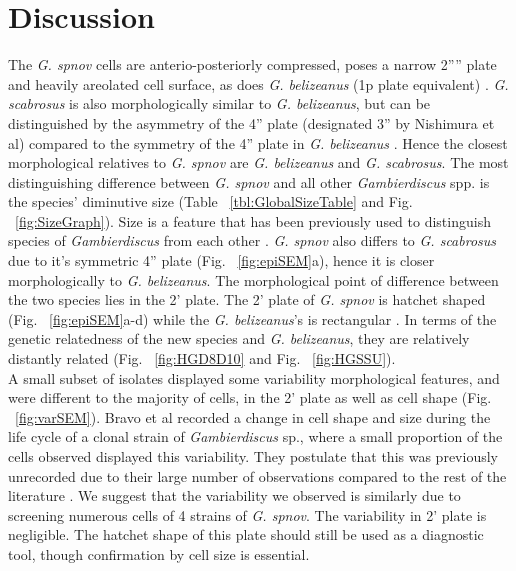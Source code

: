 \documentclass[12pt]{article}
\begin{document}
\newpage
\section{Discussion}
The \emph{G. spnov} cells are anterio-posteriorly compressed, poses a narrow 2'''' plate and heavily areolated cell surface, as does \emph{G. belizeanus} (1p plate equivalent)                                                                                                                                                                                           \citep{litaker2009taxonomy}. \emph{G. scabrosus} is also morphologically similar to \emph{G. belizeanus}, but can be distinguished by the asymmetry of the 4'' plate (designated 3'' by Nishimura et al) compared to the symmetry of the 4'' plate in \emph{G. belizeanus} \citep{nishimura2014morphology}. Hence the closest morphological relatives to \emph{G. spnov} are \emph{G. belizeanus} and \emph{G. scabrosus}. The most distinguishing difference between \emph{G. spnov} and all other \emph{Gambierdiscus} spp. is the species' diminutive size (Table ~\ref{tbl:GlobalSizeTable} and Fig. ~\ref{fig:SizeGraph}). Size is a feature that has been previously used to distinguish species of \emph{Gambierdiscus} from each other \citep{litaker2009taxonomy}. 
\emph{G. spnov} also differs to \emph{G. scabrosus} due to it's symmetric 4'' plate (Fig. ~\ref{fig:epiSEM}a), hence it is closer morphologically to \emph{G. belizeanus}. The morphological point of difference between the two species lies in the 2' plate. The 2' plate of \emph{G. spnov} is hatchet shaped (Fig. ~\ref{fig:epiSEM}a-d) while the \emph{G. belizeanus}'s is rectangular \citep{faust1995observation}. In terms of the genetic relatedness of the new species and \textit{G. belizeanus}, they are relatively distantly related (Fig. ~\ref{fig:HGD8D10} and Fig. ~\ref{fig:HGSSU}). \\
A small subset of isolates displayed some variability morphological features, and were different to the majority of cells, in the 2' plate as well as cell shape (Fig. ~\ref{fig:varSEM}). Bravo et al recorded a change in cell shape and size during the life cycle of a clonal strain of \emph{Gambierdiscus} sp., where a small proportion of the cells observed displayed this variability. They postulate that this was previously unrecorded due to their large number of observations compared to the rest of the literature \citep{bravo2014cellular}. We suggest that the variability we observed is similarly due to screening numerous cells of 4 strains of \emph{G. spnov}. The variability in 2' plate is negligible. The hatchet shape of this plate should still be used as a diagnostic tool, though confirmation by cell size is essential.\\
\end{document}
